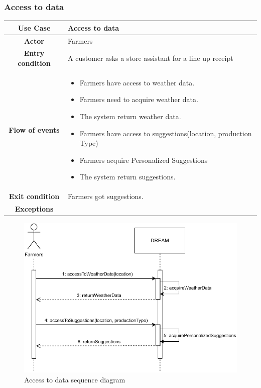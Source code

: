 \documentclass[../../main.tex]{subfiles}
\begin{document}
      \subsubsection{Access to data}

      \begin{table}[H]
        \centering
          \begin{tabular}{c m{}}
          \hline
          \textbf{Use Case} & Access to data\\ \hline
          \textbf{Actor} & Farmers\\ \hline
          \textbf{Entry condition} & A customer asks a store assistant for a line up receipt\\  \hline
          \textbf{Flow of events} & \begin{itemize}
                                      \item Farmers have access to weather data.
                                      \item Farmers need to acquire weather data.
                                      \item The system return weather data.
                                      \item Farmers have access to suggestions(location, production Type)
                                      \item Farmers acquire Personalized Suggestions
                                      \item The system return suggestions.
                                    \end{itemize}\\ \hline
          \textbf{Exit condition} & Farmers got suggestions.\\ \hline
          \textbf{Exceptions} & \\ \hline
          \end{tabular}
      \end{table}

      \begin{figure}[H]
        \centering
        \includegraphics[width=\textwidth]{RASD/image/Sequence_Diagram_Farmers-accessToData.pdf}
        \caption{Access to data sequence diagram}
      \end{figure}
\end{document}
